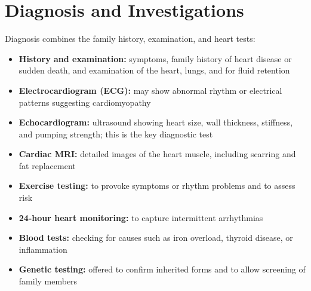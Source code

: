 \section*{Diagnosis and Investigations}
Diagnosis combines the family history, examination, and heart tests:
\begin{itemize}
    \item \textbf{History and examination:} symptoms, family history of heart disease or sudden death, and examination of the heart, lungs, and for fluid retention
    \item \textbf{Electrocardiogram (ECG):} may show abnormal rhythm or electrical patterns suggesting cardiomyopathy
    \item \textbf{Echocardiogram:} ultrasound showing heart size, wall thickness, stiffness, and pumping strength; this is the key diagnostic test
    \item \textbf{Cardiac MRI:} detailed images of the heart muscle, including scarring and fat replacement
    \item \textbf{Exercise testing:} to provoke symptoms or rhythm problems and to assess risk
    \item \textbf{24-hour heart monitoring:} to capture intermittent arrhythmias
    \item \textbf{Blood tests:} checking for causes such as iron overload, thyroid disease, or inflammation
    \item \textbf{Genetic testing:} offered to confirm inherited forms and to allow screening of family members
\end{itemize}

